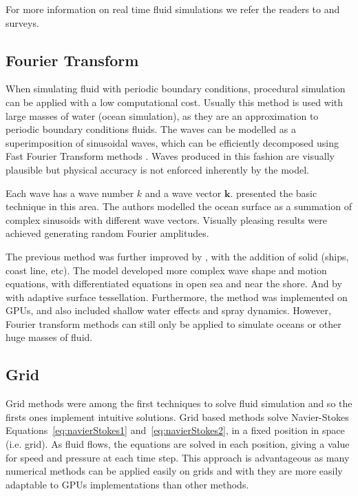 For more information on real time fluid simulations we refer the readers to \cite{Vines2012} and \cite{Ihmsen2014} surveys.

\subsection{Fourier Transform}

When simulating fluid with periodic boundary conditions, procedural simulation can be applied with a low computational cost.
Usually this method is used with large masses of water (ocean simulation), as they are an approximation to periodic boundary conditions fluids.
The waves can be modelled as a superimposition of sinusoidal waves, which can be efficiently decomposed using Fast Fourier Transform methods \cite{Mastin1987}.
Waves produced in this fashion are visually plausible but physical accuracy is not enforced inherently by the model.

Each wave has a wave number $k$ and a wave vector $\mathbf{k}$.
\cite{Tessendorf2001} presented the basic technique in this area.
The authors modelled the ocean surface as a summation of complex sinusoids with different wave vectors.
Visually pleasing results were achieved generating random Fourier amplitudes.

The previous method was further improved by \cite{Cieutat2003}, with the addition of solid (ships, coast line, etc).
The model developed more complex wave shape and motion equations, with differentiated equations in open sea and near the shore.
And by \cite{Chiu2006} with adaptive surface tessellation.
Furthermore, the method was implemented on GPUs, and also included shallow water effects and spray dynamics.
However, Fourier transform methods can still only be applied to simulate oceans or other huge masses of fluid. 

\subsection{Grid}
\label{gridFluidSolvers}

Grid methods were among the first techniques to solve fluid simulation and so the firsts ones implement intuitive solutions.
Grid based methods solve Navier-Stokes Equations~\ref{eq:navierStokes1} and~\ref{eq:navierStokes2}, in a fixed position in space (i.e. grid).
As fluid flows, the equations are solved in each position, giving a value for speed and pressure at each time step.
This approach is advantageous as many numerical methods can be applied easily on grids and with they are more easily adaptable to GPUs implementations than other methods.

